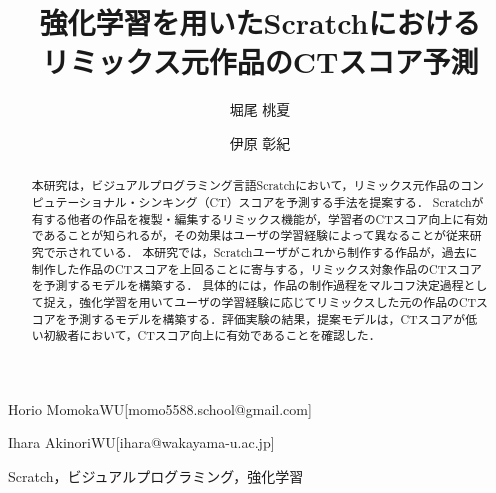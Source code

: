 \documentclass[submit,techrep,noauthor]{ipsj}
\begin{document}
\title{強化学習を用いたScratchにおける\\
リミックス元作品のCTスコア予測}





\author{堀尾 桃夏}{Horio Momoka}{WU}[momo5588.school@gmail.com]
\author{伊原 彰紀}{Ihara Akinori}{WU}[ihara@wakayama-u.ac.jp]

\begin{abstract}
本研究は，ビジュアルプログラミング言語Scratchにおいて，リミックス元作品のコンピュテーショナル・シンキング（CT）スコアを予測する手法を提案する．
Scratchが有する他者の作品を複製・編集するリミックス機能が，学習者のCTスコア向上に有効であることが知られるが，その効果はユーザの学習経験によって異なることが従来研究で示されている．
本研究では，Scratchユーザがこれから制作する作品が，過去に制作した作品のCTスコアを上回ることに寄与する，リミックス対象作品のCTスコアを予測するモデルを構築する．
具体的には，作品の制作過程をマルコフ決定過程として捉え，強化学習を用いてユーザの学習経験に応じてリミックスした元の作品のCTスコアを予測するモデルを構築する．評価実験の結果，提案モデルは，CTスコアが低い初級者において，CTスコア向上に有効であることを確認した．
\end{abstract}


%
\begin{jkeyword}
    {Scratch，ビジュアルプログラミング，強化学習}
\end{jkeyword}
%

%

\maketitle
\end{document}
